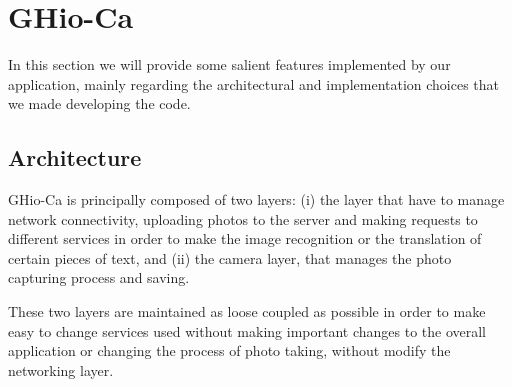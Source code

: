 \section{GHio-Ca}
In this section we will provide some salient features implemented by our
application, mainly regarding the architectural and implementation choices that
we made developing the code.

\subsection{Architecture}
GHio-Ca is principally composed of two layers: (i) the layer that have to manage
network connectivity, uploading photos to the server and making requests to
different services in order to make the image recognition or the translation of
certain pieces of text, and (ii) the camera layer, that manages the photo
capturing process and saving.

These two layers are maintained as loose coupled as possible in order to make
easy to change services used without making important changes to the overall
application or changing the process of photo taking, without modify the
networking layer.

%

